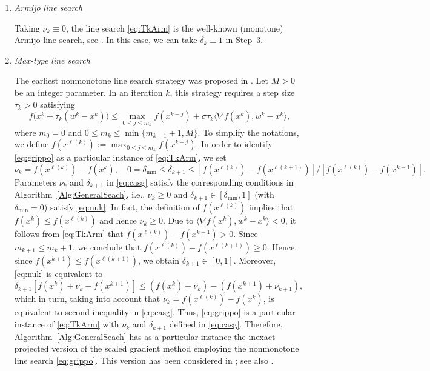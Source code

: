 \begin{enumerate}
\item {\it Armijo line search} 

	Taking  $\nu_k\equiv 0$, the line search   \eqref{eq:TkArm}  is the well-known (monotone) Armijo line search, see \cite[Section 2.3]{Bertsekas1999}. In this case, we  can take  $\delta_k\equiv 1$ in Step~3. 
	
		\item {\it Max-type line search} 
	
		The earliest nonmonotone line search strategy  was proposed  in \cite{Grippo1986}. Let $M>0$ be an integer parameter. In an iteration $k$, this strategy requires a step size $\tau_k>0$ satisfying
		\begin{equation}\label{eq:grippo}
		f\big(x^{k}+ \tau_k(w^k - x^{k})\big) \leq \max_{0\leq j\leq m_k}f(x^{k-j}) + \sigma \tau_k\big\langle \nabla f(x^{k}), w^k - x^{k} \big\rangle,
	\end{equation}
	where $m_0=0$ and $0\leq m_k\leq \min\{m_{k-1}+1, M\}$.  To simplify the notations,  we define $f(x^{\ell(k)}):=\max_{0\leq j\leq m_k}f(x^{k-j})$.  In order to identify \eqref{eq:grippo} as a particular instance of \eqref{eq:TkArm}, we  set
	\begin{equation} \label{eq:casg}
		\nu_{k}= f(x^{\ell(k)})-f(x^k), \quad 0=\delta_{\min}\leq \delta_{k+1}\leq  [f(x^{\ell(k)})- f(x^{\ell(k+1)})]/[f(x^{\ell(k)})-f(x^{k+1})].
	\end{equation}
	Parameters $\nu_{k}$ and $\delta_{k+1}$ in \eqref{eq:casg} satisfy the corresponding conditions in Algorithm~\ref{Alg:GeneralSeach}, i.e.,  $\nu_{k} \geq 0$ and  $\delta_{k+1}\in [\delta_{\min}, 1]$ (with   $\delta_{\min}=0$)  satisfy \eqref{eq:nuk}.  In fact, the definition of $f(x^{\ell(k)})$ implies that   $ f(x^{k})\leq f(x^{\ell(k)})$ and hence $\nu_{k} \geq 0$.  Due to  $\langle \nabla f(x^{k}), w^k - x^{k} \rangle<0$,   it follows from  \eqref{eq:TkArm} that $f(x^{\ell(k)})-f(x^{k+1})>0$. Since   $m_{k+1}\leq m_{k}+1$, we conclude that  $f(x^{\ell(k)})-f(x^{\ell(k+1)}) \geq 0$.  Hence, since $ f(x^{k+1})\leq f(x^{\ell(k+1)})$, we obtain $\delta_{k+1}\in [0, 1]$.  Moreover,  \eqref{eq:nuk} is equivalent  to  $\delta_{k+1}[f(x^{k})+\nu_{k}-f(x^{k+1})] \leq(f(x^{k})+\nu_{k}) -  (f(x^{k+1})+ \nu_{k+1})$,  which in turn, taking into account  that $\nu_{k}= f(x^{\ell(k)})-f(x^k)$, is equivalent to second inequality in \eqref{eq:casg}. Thus, \eqref{eq:grippo} is a particular instance of \eqref{eq:TkArm} with  $\nu_{k}$ and $\delta_{k+1}$ defined in \eqref{eq:casg}.  Therefore,  Algorithm~\ref{Alg:GeneralSeach} has as a particular instance the  inexact   projected  version of the scaled gradient method employing   the nonmonotone line search  \eqref{eq:grippo}. This version has been considered in \cite{BirginMartinezRaydan2003}; see also  \cite{Bonettini2009, WangLiu2005}.


\end{enumerate}
